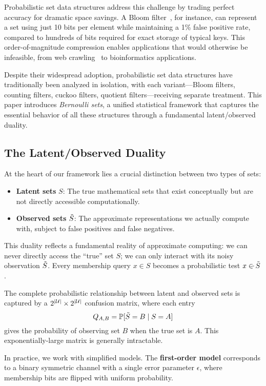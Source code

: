 \documentclass[11pt]{article}
\begin{document}
Probabilistic set data structures address this challenge by trading perfect accuracy for dramatic space savings. A Bloom filter~\cite{bloom1970}, for instance, can represent a set using just 10 bits per element while maintaining a 1\% false positive rate, compared to hundreds of bits required for exact storage of typical keys. This order-of-magnitude compression enables applications that would otherwise be infeasible, from web crawling~\cite{broder2004} to bioinformatics applications.

Despite their widespread adoption, probabilistic set data structures have traditionally been analyzed in isolation, with each variant---Bloom filters, counting filters, cuckoo filters, quotient filters---receiving separate treatment. This paper introduces \emph{Bernoulli sets}, a unified statistical framework that captures the essential behavior of all these structures through a fundamental latent/observed duality.

\subsection{The Latent/Observed Duality}

At the heart of our framework lies a crucial distinction between two types of sets:
\begin{itemize}
\item \textbf{Latent sets} $S$: The true mathematical sets that exist conceptually but are not directly accessible computationally.
\item \textbf{Observed sets} $\tilde{S}$: The approximate representations we actually compute with, subject to false positives and false negatives.
\end{itemize}

This duality reflects a fundamental reality of approximate computing: we can never directly access the ``true'' set $S$; we can only interact with its noisy observation $\tilde{S}$. Every membership query $x \in S$ becomes a probabilistic test $x \in_{\tilde{}} \tilde{S}$.

The complete probabilistic relationship between latent and observed sets is captured by a $2^{|\mathcal{U}|} \times 2^{|\mathcal{U}|}$ confusion matrix, where each entry
\[
Q_{A,B} = \mathbb{P}[\tilde{S} = B \mid S = A]
\]
gives the probability of observing set $B$ when the true set is $A$. This exponentially-large matrix is generally intractable.

In practice, we work with simplified models. The \textbf{first-order model} corresponds to a binary symmetric channel with a single error parameter $\epsilon$, where membership bits are flipped with uniform probability.
\end{document}
